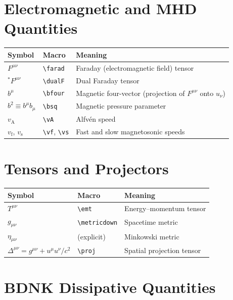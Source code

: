 \documentclass[12pt]{book}
\def\textbf#1{#1}%
\newcommand{\proj}{\Delta^{\mu\nu}}
\newcommand{\emt}{T^{\mu\nu}}
\newcommand{\farad}{F^{\mu\nu}}
\newcommand{\dualF}{{}^{*}\!F^{\mu\nu}}
\newcommand{\metricdown}{g_{\mu\nu}}
\newcommand{\vA}{v_{\mathrm{A}}}    %
\newcommand{\vf}{v_{\mathrm{f}}}    %
\newcommand{\vs}{v_{\mathrm{s}}}    %
\newcommand{\bfour}{b^{\mu}}        %
\newcommand{\bsq}{b^2}             %
\begin{document}
\section*{Electromagnetic and MHD Quantities}

\begin{center}
\renewcommand{\arraystretch}{1.25}
\begin{tabular}{@{}lll@{}}
\toprule
\textbf{Symbol} & \textbf{Macro} & \textbf{Meaning} \\
\midrule
$F^{\mu\nu}$    & \verb|\farad|    & Faraday (electromagnetic field) tensor \\
${}^*\!F^{\mu\nu}$ & \verb|\dualF| & Dual Faraday tensor \\
$b^\mu$         & \verb|\bfour|    & Magnetic four-vector (projection of $F^{\mu\nu}$ onto $u_\nu$) \\
$b^2 \equiv b^\mu b_\mu$ & \verb|\bsq| & Magnetic pressure parameter \\
$v_{\mathrm{A}}$ & \verb|\vA|     & Alfv\'en speed \\
$v_{\mathrm{f}}$, $v_{\mathrm{s}}$ & \verb|\vf|, \verb|\vs| & Fast and slow magnetosonic speeds \\
\bottomrule
\end{tabular}
\end{center}

\section*{Tensors and Projectors}

\begin{center}
\renewcommand{\arraystretch}{1.25}
\begin{tabular}{@{}lll@{}}
\toprule
\textbf{Symbol} & \textbf{Macro} & \textbf{Meaning} \\
\midrule
$T^{\mu\nu}$    & \verb|\emt|        & Energy--momentum tensor \\
$g_{\mu\nu}$    & \verb|\metricdown| & Spacetime metric \\
$\eta_{\mu\nu}$ & (explicit)         & Minkowski metric \\
$\Delta^{\mu\nu} = g^{\mu\nu} + u^\mu u^\nu/c^2$
                & \verb|\proj|       & Spatial projection tensor \\
\bottomrule
\end{tabular}
\end{center}

\section*{BDNK Dissipative Quantities}
\end{document}
